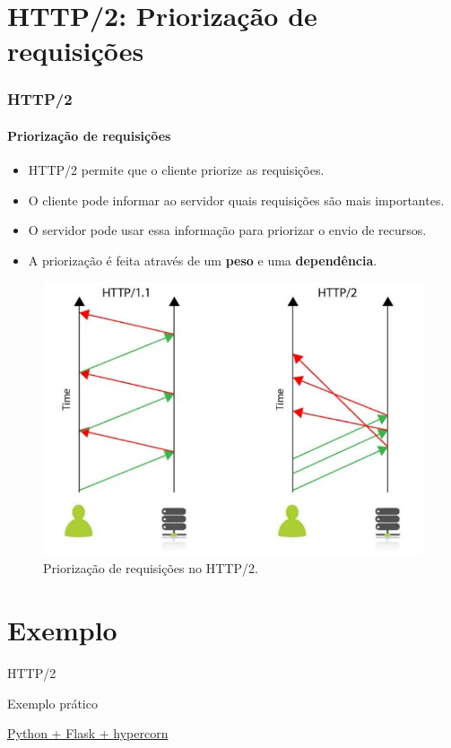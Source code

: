\documentclass[
	9pt, %
	t, %
]{beamer}
\newcommand{\iconLink}[2]{\href{#1}{\faLink \hspace{0.2em} {#2}}}
\begin{document}
\section{HTTP/2: Priorização de requisições}

\begin{frame}
	\frametitle{HTTP/2}
	\framesubtitle{Priorização de requisições}

	\begin{itemize}
		\item HTTP/2 permite que o cliente priorize as requisições.
		\item O cliente pode informar ao servidor quais requisições são mais importantes.
		\item O servidor pode usar essa informação para priorizar o envio de recursos.
		\item A priorização é feita através de um \textbf{peso} e uma \textbf{dependência}.
	\end{itemize}

	\begin{figure}
		\centering
		\includegraphics[width=0.7\linewidth]{http2_priority.png}
		\caption{Priorização de requisições no HTTP/2.}
	\end{figure}

\end{frame}

\section{Exemplo}

\begin{frame}
	\begin{center}
		
		\bigskip\bigskip\bigskip\bigskip %
		{\Large HTTP/2}
		
		\bigskip\bigskip %
		{\Huge Exemplo prático}

		\bigskip\bigskip %
		{\small \iconLink{https://gist.github.com/fabricioifc/347d275a65f1ba3371eb854f78d052ec}{Python + Flask + hypercorn}}
	\end{center}

\end{frame}
\end{document}
